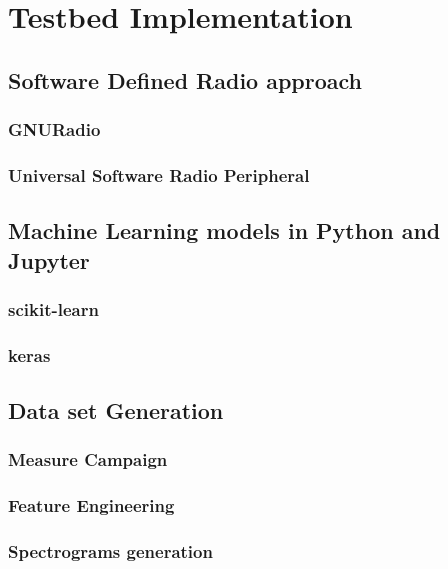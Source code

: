 \acresetall
\chapter{Testbed Implementation}\label{chapter:implementation}\label{ch:implementation}

\section{Software Defined Radio approach}
\subsection{GNURadio}
\subsection{Universal Software Radio Peripheral}
\section{Machine Learning models in Python and Jupyter}
\subsection{scikit-learn}
\subsection{keras}


\section{Data set Generation}
\subsection{Measure Campaign}
\subsection{Feature Engineering}
\subsection{Spectrograms generation}
